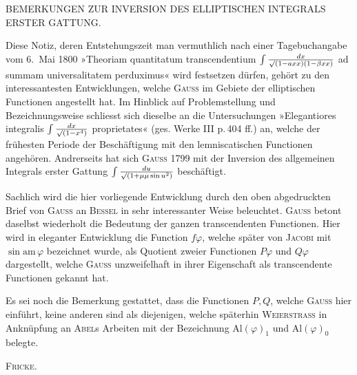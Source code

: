 %

\begin{center}
BEMERKUNGEN ZUR INVERSION DES ELLIPTISCHEN INTEGRALS ERSTER GATTUNG.
\end{center}

\noindent\hspace*{\parindent}Diese Notiz, deren Entstehungszeit man vermuthlich nach einer Tagebuchangabe vom 6.\ Mai 1800 »Theoriam quantitatum transcendentium $\int\frac{dx}{\mathord{\surd}(1-a xx)(1-\beta xx)}$ ad summam universalitatem perduximus« wird festsetzen dürfen, gehört zu den interessantesten Entwicklungen, welche \textsc{Gauss} im Gebiete der elliptischen Functionen angestellt hat. Im Hinblick auf Problemstellung und Bezeichnungsweise schliesst sich dieselbe an die Untersuchungen »Elegantiores integralis $\int\frac{dx}{\mathord{\surd}(1-x^4)}$ proprietates« (ges. Werke III p.\,404 ff.) an, welche der frühesten Periode der Beschäftigung mit den lemniscatischen Functionen angehören. Andrerseits hat sich \textsc{Gauss} 1799 mit der Inversion des allgemeinen Integrals erster Gattung $\int\frac{du}{\mathord{\surd}(1+\mu\mu\sin u^2)}$ beschäftigt.

Sachlich wird die hier vorliegende Entwicklung durch den oben abgedruckten Brief von \textsc{Gauss} an \textsc{Bessel} in sehr interessanter Weise beleuchtet. \textsc{Gauss} betont daselbst wiederholt die Bedeutung der ganzen transcendenten Functionen. Hier wird in eleganter Entwicklung die Function $f\varphi$, welche später von \textsc{Jacobi} mit $\sin\mathrm{am}\,\varphi$ bezeichnet wurde, als Quotient zweier Functionen $P\varphi$ und $Q\varphi$ dargestellt, welche \textsc{Gauss} unzweifelhaft in ihrer Eigenschaft als  transcendente Functionen gekannt hat.

Es sei noch die Bemerkung gestattet, dass die Functionen $P, Q$, welche \textsc{Gauss} hier einführt, keine anderen sind als diejenigen, welche späterhin \textsc{Weierstrass} in Anknüpfung an \textsc{Abel}s Arbeiten mit der Bezeichnung $\mathrm{Al}(\varphi)_1$ und $\mathrm{Al}(\varphi)_0$ belegte.

\hfill \textsc{Fricke}.

\bigskip

